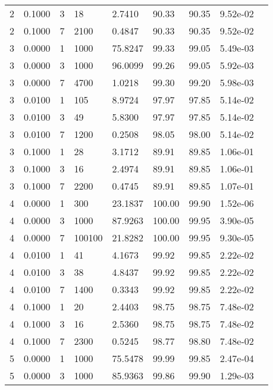 \begin{longtable}{@{}lllllllll@{}}
2           & 0.1000 & 3   & 18     & 2.7410  & 90.33   & 90.35   & 9.52e-02 &  \\
2           & 0.1000 & 7   & 2100   & 0.4847  & 90.33   & 90.35   & 9.52e-02 &  \\
3           & 0.0000 & 1   & 1000   & 75.8247 & 99.33   & 99.05   & 5.49e-03 &  \\
3           & 0.0000 & 3   & 1000   & 96.0099 & 99.26   & 99.05   & 5.92e-03 &  \\
3           & 0.0000 & 7   & 4700   & 1.0218  & 99.30   & 99.20   & 5.98e-03 &  \\
3           & 0.0100 & 1   & 105    & 8.9724  & 97.97   & 97.85   & 5.14e-02 &  \\
3           & 0.0100 & 3   & 49     & 5.8300  & 97.97   & 97.85   & 5.14e-02 &  \\
3           & 0.0100 & 7   & 1200   & 0.2508  & 98.05   & 98.00   & 5.14e-02 &  \\
3           & 0.1000 & 1   & 28     & 3.1712  & 89.91   & 89.85   & 1.06e-01 &  \\
3           & 0.1000 & 3   & 16     & 2.4974  & 89.91   & 89.85   & 1.06e-01 &  \\
3           & 0.1000 & 7   & 2200   & 0.4745  & 89.91   & 89.85   & 1.07e-01 &  \\
4           & 0.0000 & 1   & 300    & 23.1837 & 100.00  & 99.90   & 1.52e-06 &  \\
4           & 0.0000 & 3   & 1000   & 87.9263 & 100.00  & 99.95   & 3.90e-05 &  \\
4           & 0.0000 & 7   & 100100 & 21.8282 & 100.00  & 99.95   & 9.30e-05 &  \\
4           & 0.0100 & 1   & 41     & 4.1673  & 99.92   & 99.85   & 2.22e-02 &  \\
4           & 0.0100 & 3   & 38     & 4.8437  & 99.92   & 99.85   & 2.22e-02 &  \\
4           & 0.0100 & 7   & 1400   & 0.3343  & 99.92   & 99.85   & 2.22e-02 &  \\
4           & 0.1000 & 1   & 20     & 2.4403  & 98.75   & 98.75   & 7.48e-02 &  \\
4           & 0.1000 & 3   & 16     & 2.5360  & 98.75   & 98.75   & 7.48e-02 &  \\
4           & 0.1000 & 7   & 2300   & 0.5245  & 98.77   & 98.80   & 7.48e-02 &  \\
5           & 0.0000 & 1   & 1000   & 75.5478 & 99.99   & 99.85   & 2.47e-04 &  \\
5           & 0.0000 & 3   & 1000   & 85.9363 & 99.86   & 99.90   & 1.29e-03 &  \\

\end{longtable}
